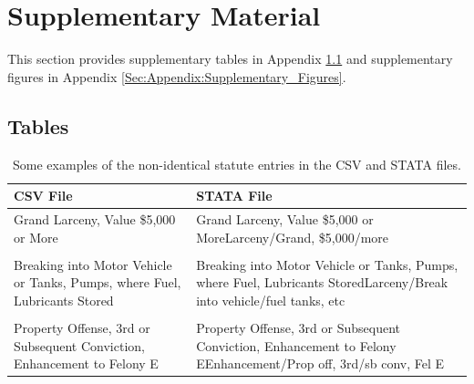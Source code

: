\documentclass[11pt, oneside]{article}   	%
\newcommand{\rowgroup}[1]{\hspace{-1em}#1}
\theoremstyle{ModifiedStyle}
\begin{document}
\section{Supplementary Material}
\label{Sec:Appendix:Supplementary_Material}
This section provides supplementary tables in Appendix \ref{Sec:Appendix:Supplementary_Tables} and supplementary figures in Appendix \ref{Sec:Appendix:Supplementary_Figures}.

\subsection{Tables}
\label{Sec:Appendix:Supplementary_Tables}
\vspace{5mm}

\begin{table}[H]
	\centering
	\caption{Some examples of the non-identical statute entries in the CSV and STATA files.}
	\vspace{-2mm}
	\setlength\tabcolsep{8pt} %
	{\footnotesize
		\begin{tabular}{L{70mm}L{70mm}}
			\toprule
			CSV File &  STATA File \\
			\midrule
			Grand Larceny, Value \$5,000 or More &
			Grand Larceny, Value \$5,000 or MoreLarceny/Grand, \$5,000/more \\
			& \\
			Breaking into Motor Vehicle or Tanks, Pumps, where Fuel, Lubricants Stored &
			Breaking into Motor Vehicle or Tanks, Pumps, where Fuel, Lubricants StoredLarceny/Break into vehicle/fuel tanks, etc \\
			& \\
			Property Offense, 3rd or Subsequent Conviction, Enhancement to Felony E &
			Property Offense, 3rd or Subsequent Conviction, Enhancement to Felony EEnhancement/Prop off, 3rd/sb conv, Fel E\\
			\bottomrule
		\end{tabular}
	}
	\label{Table_Sentencing_Data_Fields_Statute}
\end{table}
\end{document}
